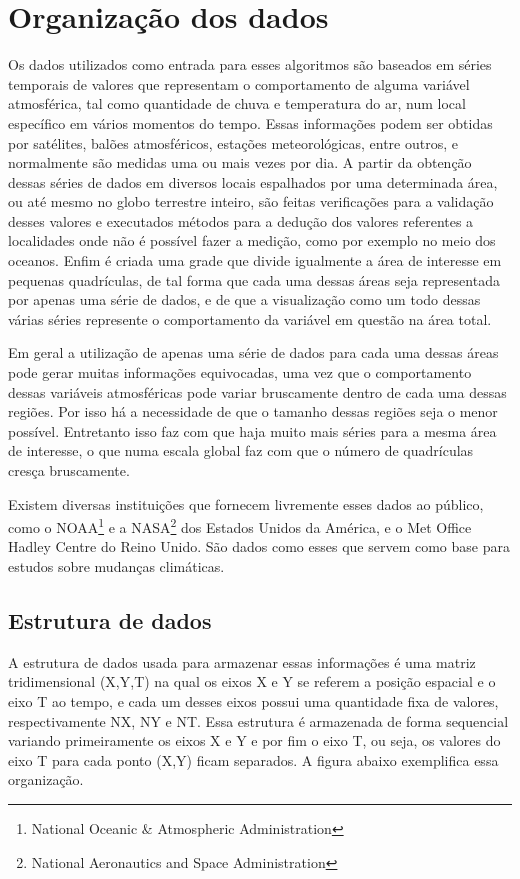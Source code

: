 \chapter{Organização dos dados}

Os dados utilizados como entrada para esses algoritmos são baseados em séries temporais de valores que representam o comportamento de alguma variável atmosférica, tal como quantidade de chuva e temperatura do ar, num local específico em vários momentos do tempo. Essas informações podem ser obtidas por satélites, balões atmosféricos, estações meteorológicas, entre outros, e normalmente são medidas uma ou mais vezes por dia. A partir da obtenção dessas séries de dados em diversos locais espalhados por uma determinada área, ou até mesmo no globo terrestre inteiro, são feitas verificações para a validação desses valores e executados métodos para a dedução dos valores referentes a localidades onde não é possível fazer a medição, como por exemplo no meio dos oceanos. Enfim é criada uma grade que divide igualmente a área de interesse em pequenas quadrículas, de tal forma que cada uma dessas áreas seja representada por apenas uma série de dados, e de que a visualização como um todo dessas várias séries represente o comportamento da variável em questão na área total. 

Em geral a utilização de apenas uma série de dados para cada uma dessas áreas pode gerar muitas informações equivocadas, uma vez que o comportamento dessas variáveis atmosféricas pode variar bruscamente dentro de cada uma dessas regiões. Por isso há a necessidade de que o tamanho dessas regiões seja o menor possível. Entretanto isso faz com que haja muito mais séries para a mesma área de interesse, o que numa escala global faz com que o número de quadrículas cresça bruscamente.

Existem diversas instituições que fornecem livremente esses dados ao público, como o NOAA\footnote{National Oceanic \& Atmospheric Administration} \cite{NOAA} e a NASA\footnote{National Aeronautics and Space Administration} \cite{NASA} dos Estados Unidos da América, e o Met Office Hadley Centre \cite{MOHC} do Reino Unido. São dados como esses que servem como base para estudos sobre mudanças climáticas.

\section{Estrutura de dados}

A estrutura de dados usada para armazenar essas informações é uma matriz tridimensional (X,Y,T) na qual os eixos X e Y se referem a posição espacial e o eixo T ao tempo, e cada um desses eixos possui uma quantidade fixa de valores, respectivamente NX, NY e NT. Essa estrutura é armazenada de forma sequencial variando primeiramente os eixos X e Y e por fim o eixo T, ou seja, os valores do eixo T para cada ponto (X,Y) ficam separados. A figura abaixo exemplifica essa organização. 

